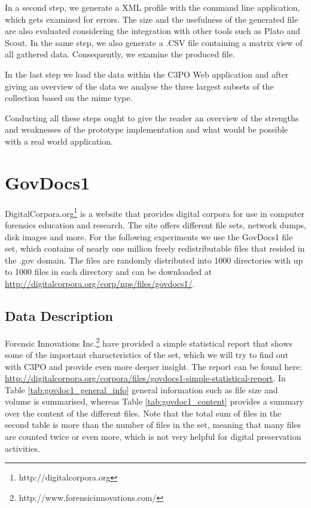 In a second step, we generate a XML profile with the command line application, which gets examined for errors. The size and the usefulness of the generated file are also evaluated considering the integration with other tools such as Plato and Scout. In the same step, we also generate a .CSV file containing a matrix view of all gathered data. Consequently, we examine the produced file.

In the last step we load the data within the C3PO Web application and after giving an overview of the data we analyse the three largest subsets of the collection based on the mime type.

Conducting all these steps ought to give the reader an overview of the strengths and weaknesses of the prototype implementation and what would be possible with a real world application.

\section{GovDocs1}
DigitalCorpora.org\footnote{http://digitalcorpora.org} is a website that provides digital corpora for use in computer forensics education and research.
The site offers different file sets, network dumps, disk images and more.
For the following experiments we use the GovDocs1 file set, which contains of nearly one million freely redistributable files that resided in the .gov domain.
The files are randomly distributed into 1000 directories with up to 1000 files in each directory and can be downloaded at \url{http://digitalcorpora.org/corp/nps/files/govdocs1/}.

\subsection{Data Description}
Forensic Innovations Inc.\footnote{http://www.forensicinnovations.com/} have provided a simple statistical report that shows some of the important characteristics of the set, which we will try to find out with C3PO and provide even more deeper insight.
The report can be found here: \url{http://digitalcorpora.org/corpora/files/govdocs1-simple-statistical-report}.
In Table \ref{tab:govdoc1_general_info} general information such as file size and volume is summarised, whereas Table \ref{tab:govdoc1_content} provides a summary over the content of the different files.
Note that the total sum of files in the second table is more than the number of files in the set, meaning that many files are counted twice or even more, which is not very helpful for digital preservation activities.

